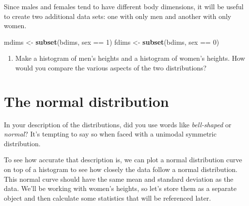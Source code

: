 \documentclass[]{book}
\newenvironment{Shaded}{\begin{snugshade}}{\end{snugshade}}
\newcommand{\KeywordTok}[1]{\textcolor[rgb]{0.13,0.29,0.53}{\textbf{{#1}}}}
\newcommand{\DecValTok}[1]{\textcolor[rgb]{0.00,0.00,0.81}{{#1}}}
\newcommand{\StringTok}[1]{\textcolor[rgb]{0.31,0.60,0.02}{{#1}}}
\newcommand{\NormalTok}[1]{{#1}}
\providecommand{\tightlist}{%
  \setlength{\itemsep}{0pt}\setlength{\parskip}{0pt}}
\theoremstyle{definition}
\theoremstyle{definition}
\theoremstyle{remark}
\begin{document}
Since males and females tend to have different body dimensions, it will
be useful to create two additional data sets: one with only men and
another with only women.

\begin{Shaded}
\begin{Highlighting}[]
\NormalTok{mdims <-}\StringTok{ }\KeywordTok{subset}\NormalTok{(bdims, sex ==}\StringTok{ }\DecValTok{1}\NormalTok{)}
\NormalTok{fdims <-}\StringTok{ }\KeywordTok{subset}\NormalTok{(bdims, sex ==}\StringTok{ }\DecValTok{0}\NormalTok{)}
\end{Highlighting}
\end{Shaded}

\begin{enumerate}
\def\labelenumi{\arabic{enumi}.}
\tightlist
\item
  Make a histogram of men's heights and a histogram of women's heights.
  How would you compare the various aspects of the two distributions?
\end{enumerate}

\section*{The normal distribution}\label{the-normal-distribution}

In your description of the distributions, did you use words like
\emph{bell-shaped} or \emph{normal}? It's tempting to say so when faced
with a unimodal symmetric distribution.

To see how accurate that description is, we can plot a normal
distribution curve on top of a histogram to see how closely the data
follow a normal distribution. This normal curve should have the same
mean and standard deviation as the data. We'll be working with women's
heights, so let's store them as a separate object and then calculate
some statistics that will be referenced later.

\begin{Shaded}
\end{Shaded}
\end{document}
